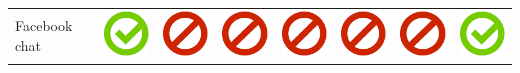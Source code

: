 \documentclass[10pt,foldmark,tumble]{leaflet}
\begin{document}
{{\begin{tabular}{ L{2cm} | C{2cm} | C{2cm} | C{2cm} | C{2cm} | C{2cm} | C{2cm} | C{2cm} | }
Facebook chat & \includegraphics[scale=0.1]{pics/haken.png} & \includegraphics[scale=0.1]{pics/nohaken.png} & \includegraphics[scale=0.1]{pics/nohaken.png} & \includegraphics[scale=0.1]{pics/nohaken.png} & \includegraphics[scale=0.1]{pics/nohaken.png} & \includegraphics[scale=0.1]{pics/nohaken.png} & \includegraphics[scale=0.1]{pics/haken.png} \tabularnewline

\end{tabular}}}
\end{document}
